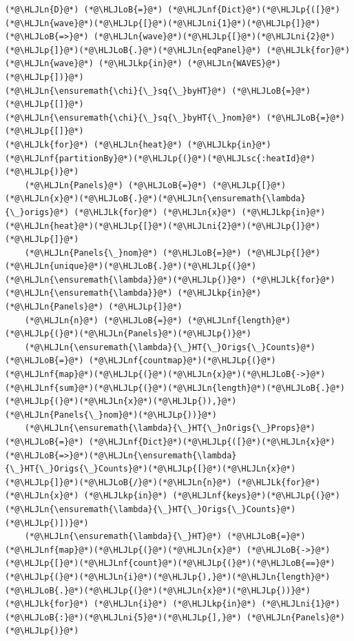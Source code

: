 \documentclass[12pt,a4paper]{article}
\newcommand{\HLJLk}[1]{\textcolor[RGB]{148,91,176}{\textbf{#1}}}
\newcommand{\HLJLkp}[1]{\textcolor[RGB]{148,91,176}{\textbf{#1}}}
\newcommand{\HLJLn}[1]{#1}
\newcommand{\HLJLnf}[1]{\textcolor[RGB]{66,102,213}{#1}}
\newcommand{\HLJLsc}[1]{\textcolor[RGB]{201,61,57}{#1}}
\newcommand{\HLJLni}[1]{\textcolor[RGB]{59,151,46}{#1}}
\newcommand{\HLJLoB}[1]{\textcolor[RGB]{102,102,102}{\textbf{#1}}}
\newcommand{\HLJLp}[1]{#1}
\begin{document}
\begin{lstlisting}
(*@\HLJLn{D}@*) (*@\HLJLoB{=}@*) (*@\HLJLnf{Dict}@*)(*@\HLJLp{([}@*)(*@\HLJLn{wave}@*)(*@\HLJLp{[}@*)(*@\HLJLni{1}@*)(*@\HLJLp{]}@*) (*@\HLJLoB{=>}@*) (*@\HLJLn{wave}@*)(*@\HLJLp{[}@*)(*@\HLJLni{2}@*)(*@\HLJLp{]}@*)(*@\HLJLoB{.}@*)(*@\HLJLn{eqPanel}@*) (*@\HLJLk{for}@*) (*@\HLJLn{wave}@*) (*@\HLJLkp{in}@*) (*@\HLJLn{WAVES}@*)(*@\HLJLp{])}@*)
(*@\HLJLn{\ensuremath{\chi}{\_}sq{\_}byHT}@*) (*@\HLJLoB{=}@*) (*@\HLJLp{[]}@*)
(*@\HLJLn{\ensuremath{\chi}{\_}sq{\_}byHT{\_}nom}@*) (*@\HLJLoB{=}@*) (*@\HLJLp{[]}@*)
(*@\HLJLk{for}@*) (*@\HLJLn{heat}@*) (*@\HLJLkp{in}@*) (*@\HLJLnf{partitionBy}@*)(*@\HLJLp{(}@*)(*@\HLJLsc{:heatId}@*)(*@\HLJLp{)}@*)
	(*@\HLJLn{Panels}@*) (*@\HLJLoB{=}@*) (*@\HLJLp{[}@*) (*@\HLJLn{x}@*)(*@\HLJLoB{.}@*)(*@\HLJLn{\ensuremath{\lambda}{\_}origs}@*) (*@\HLJLk{for}@*) (*@\HLJLn{x}@*) (*@\HLJLkp{in}@*) (*@\HLJLn{heat}@*)(*@\HLJLp{[}@*)(*@\HLJLni{2}@*)(*@\HLJLp{]}@*) (*@\HLJLp{]}@*)
	(*@\HLJLn{Panels{\_}nom}@*) (*@\HLJLoB{=}@*) (*@\HLJLp{[}@*) (*@\HLJLn{unique}@*)(*@\HLJLoB{.}@*)(*@\HLJLp{(}@*)(*@\HLJLn{\ensuremath{\lambda}}@*)(*@\HLJLp{)}@*) (*@\HLJLk{for}@*) (*@\HLJLn{\ensuremath{\lambda}}@*) (*@\HLJLkp{in}@*) (*@\HLJLn{Panels}@*) (*@\HLJLp{]}@*)
	(*@\HLJLn{n}@*) (*@\HLJLoB{=}@*) (*@\HLJLnf{length}@*)(*@\HLJLp{(}@*)(*@\HLJLn{Panels}@*)(*@\HLJLp{)}@*)
	(*@\HLJLn{\ensuremath{\lambda}{\_}HT{\_}Origs{\_}Counts}@*) (*@\HLJLoB{=}@*) (*@\HLJLnf{countmap}@*)(*@\HLJLp{(}@*) (*@\HLJLnf{map}@*)(*@\HLJLp{(}@*)(*@\HLJLn{x}@*)(*@\HLJLoB{->}@*)(*@\HLJLnf{sum}@*)(*@\HLJLp{(}@*)(*@\HLJLn{length}@*)(*@\HLJLoB{.}@*)(*@\HLJLp{(}@*)(*@\HLJLn{x}@*)(*@\HLJLp{)),}@*) (*@\HLJLn{Panels{\_}nom}@*)(*@\HLJLp{))}@*)
	(*@\HLJLn{\ensuremath{\lambda}{\_}HT{\_}nOrigs{\_}Props}@*) (*@\HLJLoB{=}@*) (*@\HLJLnf{Dict}@*)(*@\HLJLp{([}@*)(*@\HLJLn{x}@*)(*@\HLJLoB{=>}@*)(*@\HLJLn{\ensuremath{\lambda}{\_}HT{\_}Origs{\_}Counts}@*)(*@\HLJLp{[}@*)(*@\HLJLn{x}@*)(*@\HLJLp{]}@*)(*@\HLJLoB{/}@*)(*@\HLJLn{n}@*) (*@\HLJLk{for}@*) (*@\HLJLn{x}@*) (*@\HLJLkp{in}@*) (*@\HLJLnf{keys}@*)(*@\HLJLp{(}@*)(*@\HLJLn{\ensuremath{\lambda}{\_}HT{\_}Origs{\_}Counts}@*)(*@\HLJLp{)])}@*)
	(*@\HLJLn{\ensuremath{\lambda}{\_}HT}@*) (*@\HLJLoB{=}@*) (*@\HLJLnf{map}@*)(*@\HLJLp{(}@*)(*@\HLJLn{x}@*) (*@\HLJLoB{->}@*) (*@\HLJLp{[}@*)(*@\HLJLnf{count}@*)(*@\HLJLp{(}@*)(*@\HLJLoB{==}@*)(*@\HLJLp{(}@*)(*@\HLJLn{i}@*)(*@\HLJLp{),}@*)(*@\HLJLn{length}@*)(*@\HLJLoB{.}@*)(*@\HLJLp{(}@*)(*@\HLJLn{x}@*)(*@\HLJLp{))}@*) (*@\HLJLk{for}@*) (*@\HLJLn{i}@*) (*@\HLJLkp{in}@*) (*@\HLJLni{1}@*)(*@\HLJLoB{:}@*)(*@\HLJLni{5}@*)(*@\HLJLp{],}@*) (*@\HLJLn{Panels}@*) (*@\HLJLp{)}@*)

\end{lstlisting}
\end{document}
